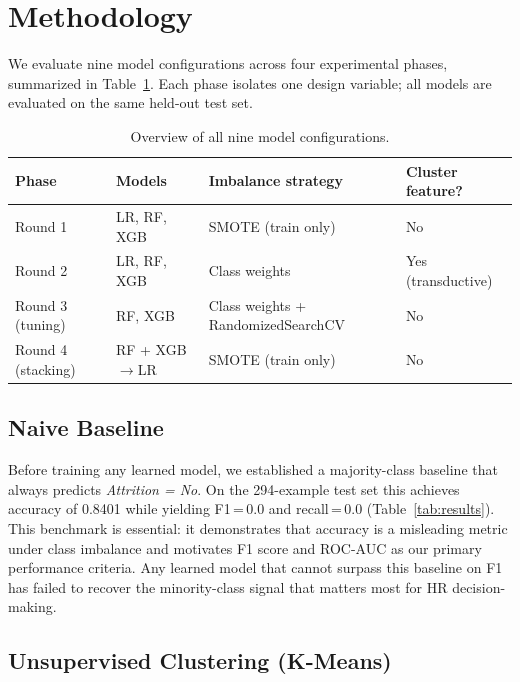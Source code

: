 \documentclass{article}
\begin{document}
\section{Methodology}
\label{sec:methods}

We evaluate nine model configurations across four experimental phases,
summarized in Table~\ref{tab:configs}. Each phase isolates one design
variable; all models are evaluated on the same held-out test set.

\begin{table}[h]
\centering
\caption{Overview of all nine model configurations.}
\label{tab:configs}
\small
\begin{tabular}{llll}
\toprule
\textbf{Phase} & \textbf{Models} & \textbf{Imbalance strategy} & \textbf{Cluster feature?} \\
\midrule
Round 1 & LR, RF, XGB & SMOTE (train only) & No \\
Round 2 & LR, RF, XGB & Class weights & Yes (transductive) \\
Round 3 (tuning) & RF, XGB & Class weights + RandomizedSearchCV & No \\
Round 4 (stacking) & RF + XGB$\to$LR & SMOTE (train only) & No \\
\bottomrule
\end{tabular}
\end{table}

\subsection{Naive Baseline}

Before training any learned model, we established a majority-class
baseline that always predicts \textit{Attrition = No}. On the 294-example
test set this achieves accuracy of 0.8401 while yielding F1\,=\,0.0 and
recall\,=\,0.0 (Table~\ref{tab:results}). This benchmark is essential: it
demonstrates that accuracy is a misleading metric under class imbalance and
motivates F1 score and ROC-AUC as our primary performance criteria. Any
learned model that cannot surpass this baseline on F1 has failed to recover
the minority-class signal that matters most for HR decision-making.

\subsection{Unsupervised Clustering (K-Means)}
\end{document}
